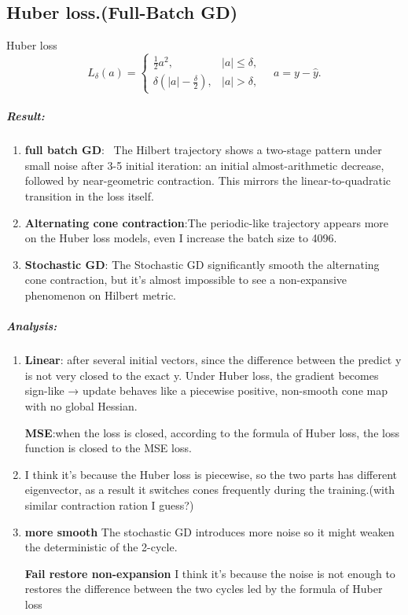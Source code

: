 \documentclass[11pt]{article}
\begin{document}
\subsection{Huber loss.(Full-Batch GD)}
Huber loss
\[
L_\delta(a)=
\begin{cases}
\frac{1}{2}a^2, & |a|\le\delta,\\[3pt]
\delta(|a|-\frac{\delta}{2}), & |a|>\delta,
\end{cases} \quad  a = y - \hat{y}.
\]
\subparagraph{\textbf{Result:}}
\begin{enumerate}
    \item \textbf{full batch GD}: \ The Hilbert trajectory shows a two-stage pattern under small noise after 3-5 initial iteration: an initial
almost-arithmetic decrease, followed by near-geometric contraction.  This mirrors the linear-to-quadratic transition in the loss itself.
    \item \textbf{Alternating cone contraction}:The periodic-like trajectory appears more on the Huber loss models, even I increase the batch size to 4096.
    \item \textbf{Stochastic GD}: The Stochastic GD significantly smooth the alternating cone contraction, but it's almost impossible to see a non-expansive phenomenon on Hilbert metric. 
\end{enumerate}
\subparagraph{\textbf{Analysis:}}
\begin{enumerate}
    \item \textbf{Linear}: after several initial vectors, since the difference between the predict y is not very closed to the exact y. Under Huber loss, the gradient becomes sign-like → update behaves like a piecewise positive, non-smooth cone map with no global Hessian.
    
    \textbf{MSE}:when the loss is closed, according to the formula of Huber loss, the loss function is closed to the MSE loss.
    \item I think it's because the Huber loss is piecewise, so the two parts has different eigenvector, as a result it switches cones frequently during the training.(with similar contraction ration I guess?)
    \item \textbf{more smooth} The stochastic GD introduces more noise so it might weaken the deterministic of the 2-cycle. 
    
    \textbf{Fail restore non-expansion} I think it's because the noise is not enough to restores the difference between the two cycles led by the formula of Huber loss
\end{enumerate}
\end{document}
